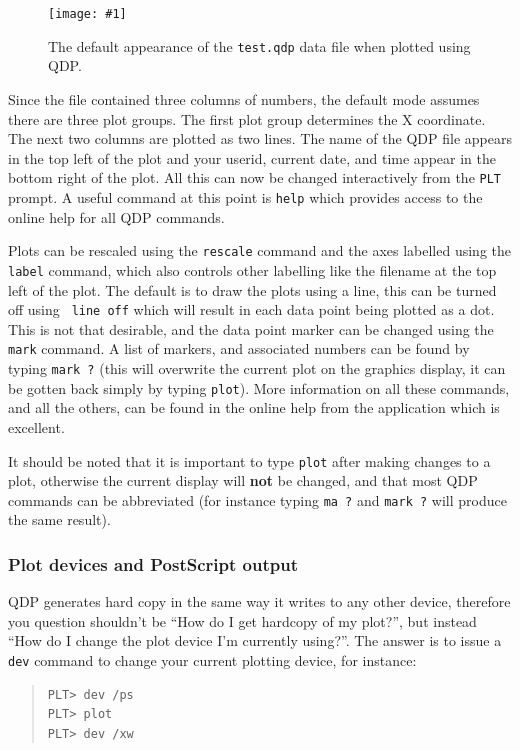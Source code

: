 \documentclass[twoside,11pt]{article}
\newcommand{\htmladdimg}[1]{}
\newcommand{\myfig}[5]{
  \begin{figure}
    \centering\texttt{[image: \#1]}
    \typeout{#1 inserted on page \arabic{page}}
    \caption{\label{#4}#5}
  \end{figure}
  }
\newcommand{\myfig}[5]{
    \label{#4} \htmladdimg{#3}\\
    Figure: #5\\
  }
\begin{document}
\myfig{sc15_qdp_plot_1.eps}{height=0.3\textheight}{sc15_qdp_plot_1.gif}{sc15_qdp_plot_1}{The
default appearance of the {\tt test.qdp} data file when plotted using
QDP.}

Since the file contained three columns of numbers, the default mode
assumes there are three plot groups. The first plot group determines
the X coordinate. The next two columns are plotted as two lines. The
name of the QDP file appears in the top left of the plot and your
userid, current date, and time appear in the bottom right of the plot.
All this can now be changed interactively from the {\tt PLT} prompt. A
useful command at this point is {\tt help} which provides access to
the online help for all QDP commands.

Plots can be rescaled using the {\tt rescale} command and the axes
labelled using the {\tt label} command, which also controls other
labelling like the filename at the top left of the plot. The default
is to draw the plots using a line, this can be turned off using {\tt
line off} which will result in each data point being plotted as a dot.
This is not that desirable, and the data point marker can be changed
using the {\tt mark} command. A list of markers, and associated
numbers can be found by typing {\tt mark ?} (this will overwrite the
current plot on the graphics display, it can be gotten back simply by
typing {\tt plot}). More information on all these commands, and all
the others, can be found in the online help from the application which
is excellent.

It should be noted that it is important to type {\tt plot} after
making changes to a plot, otherwise the current display will {\bf not}
be changed, and that most QDP commands can be abbreviated (for
instance typing {\tt ma ?} and {\tt mark ?} will produce the same
result).

\subsubsection{Plot devices and PostScript output}

QDP generates hard copy in the same way it writes to any other device,
therefore you question shouldn't be ``How do I get hardcopy of my
plot?'', but instead ``How do I change the plot device I'm currently
using?''. The answer is to issue a {\tt dev} command to change your
current plotting device, for instance:

\small
\begin{quote}
\begin{verbatim}
PLT> dev /ps
PLT> plot
PLT> dev /xw
\end{verbatim}
\end{quote}
\normalsize
\end{document}
